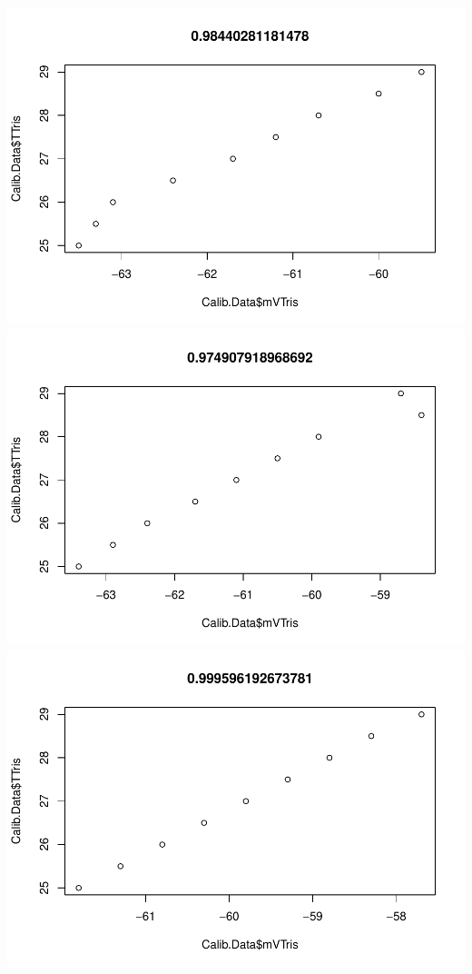 \documentclass[
]{article}
\begin{document}
\includegraphics{daily-measurements_files/figure-latex/unnamed-chunk-5-13.pdf}
\includegraphics{daily-measurements_files/figure-latex/unnamed-chunk-5-14.pdf}
\includegraphics{daily-measurements_files/figure-latex/unnamed-chunk-5-15.pdf}
\end{document}
